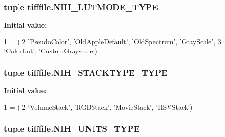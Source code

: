 \hypertarget{namespacetifffile_a29b05f1c529c5abd896aec6cee9a1af3}{
\subsubsection[{N\-I\-H\-\_\-\-L\-U\-T\-M\-O\-D\-E\-\_\-\-T\-Y\-P\-E}]{\setlength{\rightskip}{0pt plus 5cm}tuple tifffile.\-N\-I\-H\-\_\-\-L\-U\-T\-M\-O\-D\-E\-\_\-\-T\-Y\-P\-E}}\label{namespacetifffile_a29b05f1c529c5abd896aec6cee9a1af3}
{\bfseries Initial value\-:}
\begin{DoxyCode}
1 = (
2     \textcolor{stringliteral}{'PseudoColor'}, \textcolor{stringliteral}{'OldAppleDefault'}, \textcolor{stringliteral}{'OldSpectrum'}, \textcolor{stringliteral}{'GrayScale'},
3     \textcolor{stringliteral}{'ColorLut'}, \textcolor{stringliteral}{'CustomGrayscale'})
\end{DoxyCode}
\hypertarget{namespacetifffile_a5c299b8313ca1b50275a0cdf769509ff}{
\subsubsection[{N\-I\-H\-\_\-\-S\-T\-A\-C\-K\-T\-Y\-P\-E\-\_\-\-T\-Y\-P\-E}]{\setlength{\rightskip}{0pt plus 5cm}tuple tifffile.\-N\-I\-H\-\_\-\-S\-T\-A\-C\-K\-T\-Y\-P\-E\-\_\-\-T\-Y\-P\-E}}\label{namespacetifffile_a5c299b8313ca1b50275a0cdf769509ff}
{\bfseries Initial value\-:}
\begin{DoxyCode}
1 = (
2     \textcolor{stringliteral}{'VolumeStack'}, \textcolor{stringliteral}{'RGBStack'}, \textcolor{stringliteral}{'MovieStack'}, \textcolor{stringliteral}{'HSVStack'})
\end{DoxyCode}
\hypertarget{namespacetifffile_ae5e364e222f33b0da9bf47077e7e20da}{
\subsubsection[{N\-I\-H\-\_\-\-U\-N\-I\-T\-S\-\_\-\-T\-Y\-P\-E}]{\setlength{\rightskip}{0pt plus 5cm}tuple tifffile.\-N\-I\-H\-\_\-\-U\-N\-I\-T\-S\-\_\-\-T\-Y\-P\-E}}\label{namespacetifffile_ae5e364e222f33b0da9bf47077e7e20da}
